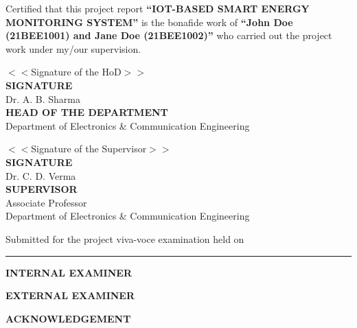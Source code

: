 \documentclass[12pt,a4paper]{report}
\newcommand{\sixteen}{\fontsize{16}{19.2}\selectfont}   %
\newcommand{\fourteen}{\fontsize{14}{21}\selectfont}    %
\newcommand{\ProjectTitle}{IOT-BASED SMART ENERGY MONITORING SYSTEM}
\newcommand{\CandidateOne}{John Doe (21BEE1001)}
\newcommand{\CandidateTwo}{Jane Doe (21BEE1002)}
\newcommand{\HoDName}{Dr. A. B. Sharma}
\newcommand{\SupervisorName}{Dr. C. D. Verma}
\newcommand{\SupervisorDesignation}{Associate Professor}
\newcommand{\DeptName}{Department of Electronics \& Communication Engineering}
\begin{document}
\vspace{0.40in}

{\fourteen
Certified that this project report \textbf{``\ProjectTitle''} is the bonafide
work of \textbf{``\CandidateOne{} and \CandidateTwo''} who carried out the
project work under my/our supervision.\par}

\vspace{0.55in}

\begin{singlespace}
\noindent
\begin{minipage}[t]{0.47\textwidth}
\raggedright
\fourteen
$<<$Signature of the HoD$>>$\\[0.45in]
\textbf{SIGNATURE}\\[0.18in]
\HoDName\\[0.10in]
\textbf{HEAD OF THE DEPARTMENT}\\[0.10in]
\DeptName
\end{minipage}
\hfill
\begin{minipage}[t]{0.47\textwidth}
\raggedright
\fourteen
$<<$Signature of the Supervisor$>>$\\[0.45in]
\textbf{SIGNATURE}\\[0.18in]
\SupervisorName\\[0.10in]
\textbf{SUPERVISOR}\\[0.10in]
\SupervisorDesignation\\[0.10in]
\DeptName
\end{minipage}
\end{singlespace}

\vspace{0.50in}

{\fourteen Submitted for the project viva-voce examination held on
\rule{1.6in}{0.4pt}\par}

\vspace{0.55in}

\begin{singlespace}
\noindent
\begin{minipage}[t]{0.47\textwidth}
\raggedright\bfseries\fourteen INTERNAL EXAMINER
\end{minipage}
\hfill
\begin{minipage}[t]{0.47\textwidth}
\raggedright\bfseries\fourteen EXTERNAL EXAMINER
\end{minipage}
\end{singlespace}

\clearpage

\begin{center}
\vspace*{0.1in}
{\bfseries\sixteen ACKNOWLEDGEMENT\par}
\end{center}
\vspace{0.3in}
\end{document}
